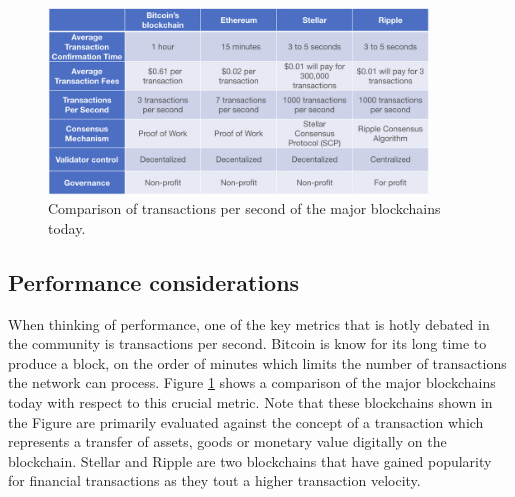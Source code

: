 \begin{figure}[t]
    \centering
    \includegraphics[width=0.90\textwidth]{tps_speed2.png}
  \caption{Comparison of transactions per second of the major blockchains today.}
    \label{fig:tps_speed}
\end{figure}

\subsection{Performance considerations}
When thinking of performance, one of the key metrics that is hotly debated in the community is transactions per second.
Bitcoin is know for its long time to produce a block, on the order of minutes which limits the number of transactions
the network can process. Figure \ref{fig:tps_speed} shows a comparison of the major blockchains today with respect to
this crucial metric. Note that these blockchains shown in the Figure are primarily evaluated against the concept of a
transaction which represents a transfer of assets, goods or monetary value digitally on the blockchain. Stellar and
Ripple are two blockchains that have gained popularity for financial transactions as they tout a higher transaction
velocity. 

